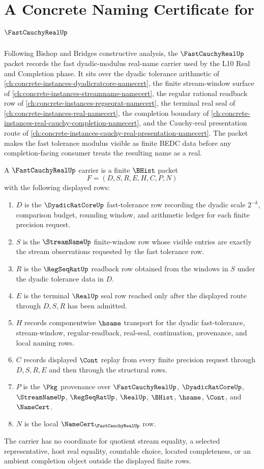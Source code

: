 \chapter{A Concrete Naming Certificate for $\FastCauchyRealUp$}
\label{ch:concrete-instances-fast-cauchy-real-namecert}

Following Bishop and Bridges constructive analysis, the $\FastCauchyRealUp$ packet records the fast dyadic-modulus real-name carrier used by the L10 Real and Completion phase. It sits over the dyadic tolerance arithmetic of \autoref{ch:concrete-instances-dyadicratcore-namecert}, the finite stream-window surface of \autoref{ch:concrete-instances-streamname-namecert}, the regular rational readback row of \autoref{ch:concrete-instances-regseqrat-namecert}, the terminal real seal of \autoref{ch:concrete-instances-real-namecert}, the completion boundary of \autoref{ch:concrete-instances-real-cauchy-completion-namecert}, and the Cauchy-real presentation route of \autoref{ch:concrete-instances-cauchy-real-presentation-namecert}. The packet makes the fast tolerance modulus visible as finite BEDC data before any completion-facing consumer treats the resulting name as a real.

\begin{definition}
\label{def:fast-cauchy-real-carrier}
A $\FastCauchyRealUp$ carrier is a finite $\BHist$ packet
$$
F=(D,S,R,E,H,C,P,N)
$$
with the following displayed rows:
\begin{enumerate}
\item $D$ is the $\DyadicRatCoreUp$ fast-tolerance row recording the dyadic scale $2^{-k}$, comparison budget, rounding window, and arithmetic ledger for each finite precision request.
\item $S$ is the $\StreamNameUp$ finite-window row whose visible entries are exactly the stream observations requested by the fast tolerance row.
\item $R$ is the $\RegSeqRatUp$ readback row obtained from the windows in $S$ under the dyadic tolerance data in $D$.
\item $E$ is the terminal $\RealUp$ seal row reached only after the displayed route through $D,S,R$ has been admitted.
\item $H$ records componentwise $\hsame$ transport for the dyadic fast-tolerance, stream-window, regular-readback, real-seal, continuation, provenance, and local naming rows.
\item $C$ records displayed $\Cont$ replay from every finite precision request through $D,S,R,E$ and then through the structural rows.
\item $P$ is the $\Pkg$ provenance over $\FastCauchyRealUp$, $\DyadicRatCoreUp$, $\StreamNameUp$, $\RegSeqRatUp$, $\RealUp$, $\BHist$, $\hsame$, $\Cont$, and $\NameCert$.
\item $N$ is the local $\NameCert_{\FastCauchyRealUp}$ row.
\end{enumerate}
The carrier has no coordinate for quotient stream equality, a selected representative, host real equality, countable choice, located completeness, or an ambient completion object outside the displayed finite rows.
\end{definition}

